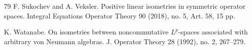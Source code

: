 \documentclass[leqno]{article} %
\let\L\relax
\newcommand{\L}{\mathrm{L}}
\numberwithin{equation}{section}
\begin{document}
\begin{thebibliography}{79}
F. Sukochev and A. Veksler.
\newblock Positive linear isometries in symmetric operator spaces.
\newblock Integral Equations Operator Theory 90 (2018), no. 5, Art. 58, 15 pp.
















K. Watanabe.
\newblock On isometries between noncommutative $L^p$-spaces associated with arbitrary von Neumann algebras.
\newblock J. Operator Theory 28 (1992), no. 2, 267--279.


\end{thebibliography}
\end{document}
